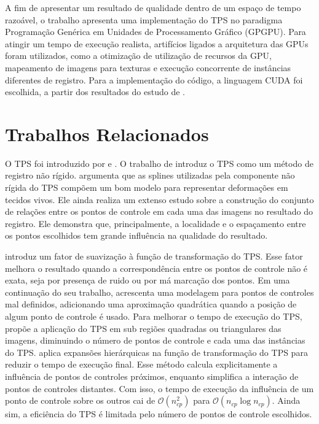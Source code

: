  A fim de apresentar um resultado de qualidade dentro de um espaço de tempo
razoável, o trabalho apresenta uma implementação do TPS no paradigma Programação 
Genérica em Unidades de  Processamento Gráfico (GPGPU). Para atingir um tempo
de execução realista, artifícios ligados a arquitetura das GPUs foram utilizados,
como a otimização de utilização de recursos da GPU, mapeamento de imagens para
texturas e execução concorrente de instâncias diferentes de registro. Para a
implementação do código, a linguagem CUDA foi escolhida, a partir dos resultados
do estudo de \cite{membarth2011frameworks}.
\section{Trabalhos Relacionados}
\label{sec:trabalhosRelacionados}

  O TPS foi introduzido por \cite{bookstein1989principal} e \cite{goshtasby1988registration}.
O trabalho de \citeauthor{goshtasby1988registration} introduz o TPS como um método
de registro não rígido. \citeauthor{bookstein1989principal} argumenta que as splines 
utilizadas pela componente não rígida do TPS compõem um bom modelo para representar
deformações em tecidos vivos. Ele ainda realiza um extenso estudo sobre a
construção do conjunto de relações entre os pontos de controle em cada uma das imagens
no resultado do registro. Ele demonstra que, principalmente, a localidade e o 
espaçamento entre os pontos escolhidos tem grande influência na qualidade do resultado.

  \cite{rohr1996nonrigid} introduz um fator de suavização à função de transformação
do TPS. Esse fator melhora o resultado quando a correspondência entre os pontos de controle
não é exata, seja por presença de ruido ou por má marcação dos pontos. Em uma continuação 
do seu trabalho, \cite{rohr2001landmark} acrescenta uma modelagem para pontos de controles
mal definidos, adicionando uma aproximação quadrática quando a posição
de algum ponto de controle é usado. Para melhorar o tempo de execução do TPS,
\cite{flusser1992adaptive} propõe a aplicação do TPS em sub regiões quadradas ou
triangulares das imagens, diminuindo o número de pontos de controle e cada uma
das instâncias do TPS. \cite{beatson1992fast} aplica expansões hierárquicas na
função de transformação do TPS para reduzir o tempo de execução final. Esse
método calcula explicitamente a influência de pontos de controles próximos,
enquanto simplifica a interação de pontos de controles distantes. Com isso,
o tempo de execução da influência de um ponto de controle sobre os outros cai de
$\mathcal{O}(n_{cp}^2)$ para $\mathcal{O}(n_{cp}\log{n_{cp}})$. Ainda sim, a
eficiência do TPS é limitada pelo número de pontos de controle escolhidos.

